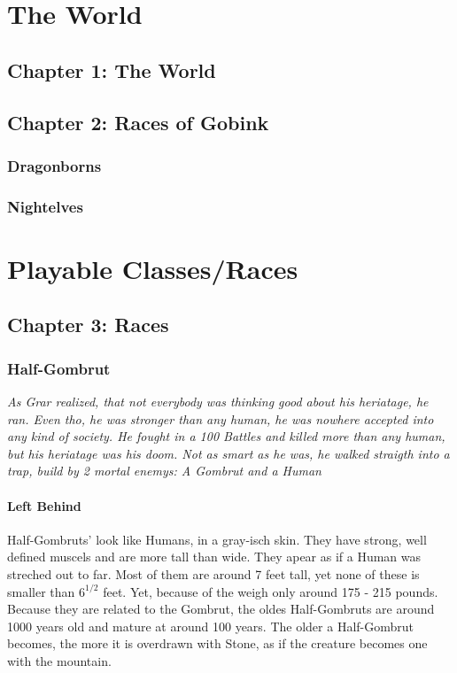 \documentclass[10pt,twoside,twocolumn,openany]{book}
\begin{document}
\selectfont %




\tableofcontents

\part{The World}
\chapter{Chapter 1: The World}

\newpage
\chapter{Chapter 2: Races of Gobink}
\section{Dragonborns}

\newpage
\section{Nightelves}


\part{Playable Classes/Races}
\chapter{Chapter 3: Races}
\section{Half-Gombrut}
\textit{As Grar realized, that not everybody was thinking good about his heriatage, he ran. Even tho, he was  stronger than any human, he was nowhere accepted into any kind of  society. He fought in a 100 Battles and killed more than any human, but his heriatage was his doom. Not as smart as he was, he walked straigth into a trap, build by 2 mortal enemys: A Gombrut and a Human}

\subsection{Left Behind}
Half-Gombruts' look like Humans, in a gray-isch skin. They have strong, well defined muscels and are more tall than wide. They apear as if a Human was streched out to far. Most of them are around 7 feet tall, yet none of these is smaller  than $6^{1/2}$ feet. Yet, because of the weigh only around 175 - 215 pounds. Because they are related to the Gombrut, the oldes Half-Gombruts are around 1000 years old and mature at around 100 years. The older a Half-Gombrut becomes, the more it is overdrawn with Stone, as if the creature becomes one with the mountain.
\end{document}
